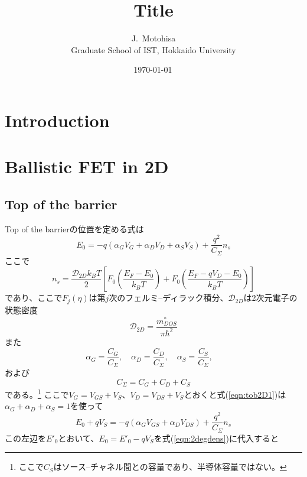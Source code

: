 \documentclass[11pt,uplatex,a4paper]{jsarticle}
\begin{document}
\title{Title}
\author{J.~Motohisa\\Graduate School of IST, Hokkaido University}
\date{\shortdate\today \, \ampmtime }
\maketitle

\section{Introduction}

\section{Ballistic FET in 2D}
\subsection{Top of the barrier}
Top of the barrierの位置を定める式は
\begin{equation}
 E_0 = -q(\alpha_G V_G + \alpha_D V_D + \alpha_S V_S) + \frac{q^2}{C_{\Sigma}} n_s
  \label{eqn:tob2D1}
\end{equation}
ここで
\begin{equation}
 n_s = \frac{\mathcal{D}_{2D}k_B T}{2}
  \left[
   F_0(\frac{E_F - E_0}{k_B T})+
   F_0(\frac{E_F -q V_D- E_0}{k_B T})
										 \right]
  \label{eqn:2degdens}
\end{equation}
であり、ここで$F_j(\eta)$は第$j$次のフェルミ--ディラック積分、$\mathcal{D}_{2D}$は2次元電子の状態密度
\begin{equation}
 \mathcal{D}_{2D} = \frac{m^*_{DOS}}{\pi \hbar^2}
\end{equation}
また
\begin{equation}
 \alpha_{G} = \frac{C_G}{C_{\Sigma}}, \quad
  \alpha_{D} = \frac{C_D}{C_{\Sigma}}, \quad
   \alpha_{S} = \frac{C_S}{C_{\Sigma}}, \quad
\end{equation}
および
\begin{equation}
 C_{\Sigma} = C_{G} + C_{D} + C_{S}
\end{equation}
である。\footnote{ここで$C_S$はソース--チャネル間との容量であり、半導体容量ではない。}
ここで$V_{G}=V_{GS}+V_{S}$、$V_{D}=V_{DS}+V_{S}$とおくと式(\ref{eqn:tob2D1})は
$\alpha_G + \alpha_D + \alpha_S =1$を使って
\begin{equation}
 E_0 + q V_S = -q(\alpha_G V_{GS} + \alpha_D V_{DS}) + \frac{q^2}{C_{\Sigma}} n_s
\end{equation}
この左辺を$E'_0$とおいて、$E_0 = E'_0 - q V_{S}$を式(\ref{eqn:2degdens})に代入すると
\end{document}

